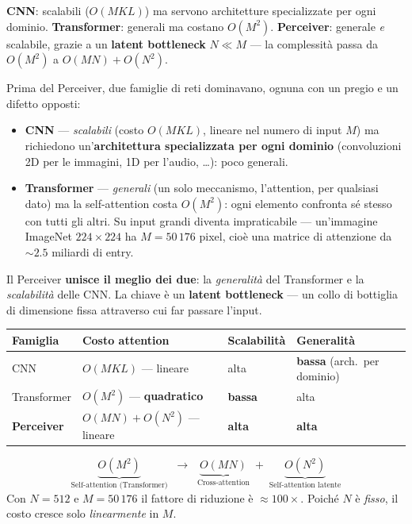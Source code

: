 \documentclass[11pt]{article}
\begin{document}
\begin{brevebox}[title={\textbf{In breve}}]
\textbf{CNN}: scalabili ($O(MKL)$) ma servono architetture specializzate per ogni dominio. \textbf{Transformer}: generali ma costano $O(M^2)$. \textbf{Perceiver}: generale \emph{e} scalabile, grazie a un \textbf{latent bottleneck} $N \ll M$ --- la complessità passa da $O(M^2)$ a $O(MN) + O(N^2)$.
\end{brevebox}

Prima del Perceiver, due famiglie di reti dominavano, ognuna con un pregio e un difetto opposti:

\begin{itemize}
\item \textbf{CNN} --- \emph{scalabili} (costo $O(MKL)$, lineare nel numero di input $M$) ma richiedono un'\textbf{architettura specializzata per ogni dominio} (convoluzioni 2D per le immagini, 1D per l'audio, \dots): poco generali.
\item \textbf{Transformer} --- \emph{generali} (un solo meccanismo, l'attention, per qualsiasi dato) ma la self-attention costa $O(M^2)$: ogni elemento confronta sé stesso con tutti gli altri. Su input grandi diventa impraticabile --- un'immagine ImageNet $224\times224$ ha $M = 50\,176$ pixel, cioè una matrice di attenzione da $\sim2.5$ miliardi di entry.
\end{itemize}

Il Perceiver \textbf{unisce il meglio dei due}: la \emph{generalità} del Transformer e la \emph{scalabilità} delle CNN. La chiave è un \textbf{latent bottleneck} --- un collo di bottiglia di dimensione fissa attraverso cui far passare l'input.

\begin{center}
\begin{tabular}{@{}llll@{}}
\toprule
\textbf{Famiglia} & \textbf{Costo attention} & \textbf{Scalabilità} & \textbf{Generalità} \\
\midrule
CNN          & $O(MKL)$ --- lineare        & alta  & \textbf{bassa} (arch.\ per dominio) \\
Transformer  & $O(M^2)$ --- \textbf{quadratico} & \textbf{bassa} & alta \\
\textbf{Perceiver} & $O(MN)+O(N^2)$ --- lineare & \textbf{alta} & \textbf{alta} \\
\bottomrule
\end{tabular}
\end{center}

\begin{formulabox}[title={\textbf{Riduzione della complessità}}]
\[
\underbrace{O(M^2)}_{\text{Self-attention (Transformer)}}
\;\;\longrightarrow\;\;
\underbrace{O(MN)}_{\text{Cross-attention}} \;+\; \underbrace{O(N^2)}_{\text{Self-attention latente}}
\]
Con $N = 512$ e $M = 50\,176$ il fattore di riduzione è $\approx 100\times$. Poiché $N$ è \emph{fisso}, il costo cresce solo \emph{linearmente} in $M$.
\end{formulabox}
\end{document}
